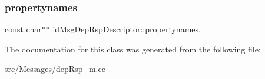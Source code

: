 \subsubsection{\texorpdfstring{propertynames}{propertynames}}
{\footnotesize\ttfamily const char$\ast$$\ast$ id\+Msg\+Dep\+Rsp\+Descriptor\+::propertynames\hspace{0.3cm}{\ttfamily [mutable]}, {\ttfamily [private]}}



The documentation for this class was generated from the following file\+:\begin{DoxyCompactItemize}
\item 
src/\+Messages/\hyperlink{dep_rsp__m_8cc}{dep\+Rsp\+\_\+m.\+cc}\end{DoxyCompactItemize}
